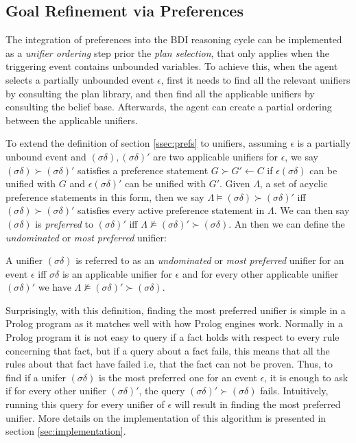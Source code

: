 \subsection{Goal Refinement via Preferences}
\label{ssec:goalref}
The integration of preferences into the BDI reasoning cycle can be implemented as a \textit{unifier ordering} step prior the \textit{plan selection}, that only applies when the triggering event contains unbounded variables. To achieve this, when the agent selects a partially unbounded event $\epsilon$, first it needs to find all the relevant unifiers by consulting the plan library, and then find all the applicable unifiers by consulting the belief base. Afterwards, the agent can create a partial ordering between the applicable unifiers. 

To extend the definition of section \ref{ssec:prefs} to unifiers, assuming $\epsilon$ is a partially unbound event and $(\sigma\delta),(\sigma\delta)'$ are two applicable unifiers for $\epsilon$, we say $(\sigma\delta) \succ (\sigma\delta)'$ satisfies a preference statement $G \succ G' \leftarrow C$ if $\epsilon(\sigma\delta)$ can be unified with $G$ and $\epsilon(\sigma\delta)'$ can be unified with $G'$. Given  $\Lambda$, a set of acyclic preference statements in this form, then we say $\Lambda \models (\sigma\delta) \succ (\sigma\delta)'$ iff $(\sigma\delta) \succ (\sigma\delta)'$ satisfies every active preference statement in $\Lambda$. We can then say $(\sigma\delta)$ is \textit{preferred} to $(\sigma\delta)'$ iff $\Lambda \not\models (\sigma\delta)' \succ (\sigma\delta)$. An then we can define the \textit{undominated} or \textit{most preferred} unifier:

\begin{definition}
\label{def:mpu}
A unifier $(\sigma\delta)$ is referred to as an \textit{undominated} or \textit{most preferred} unifier for an event $\epsilon$ iff $\sigma\delta$ is an applicable unifier for $\epsilon$ and for every other applicable unifier $(\sigma\delta)'$ we have $\Lambda \not\models (\sigma\delta)' \succ (\sigma\delta)$.
\end{definition}

Surprisingly, with this definition, finding the most preferred unifier is simple in a Prolog program as it matches well with how Prolog engines work. Normally in a Prolog program it is not easy to query if a fact holds with respect to every rule concerning that fact, but if a query about a fact fails, this means that all the rules about that fact have failed i.e, that the fact can not be proven. Thus, to find if a unifer $(\sigma\delta)$ is the most preferred one for an event $\epsilon$, it is enough to ask if for every other unifier $(\sigma\delta)'$, the query $(\sigma\delta)' \succ (\sigma\delta)$ fails. Intuitively, running this query for every unifier of $\epsilon$ will result in finding the most preferred unifier. More details on the implementation of this algorithm is presented in section \ref{sec:implementation}.

